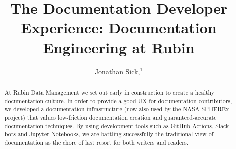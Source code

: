 \documentclass[11pt,twoside]{article}
\begin{document}
\title{The Documentation Developer Experience: Documentation Engineering at Rubin}

\author{Jonathan Sick,$^1$}





\begin{abstract}
At Rubin Data Management we set out early in construction to create a healthy documentation culture.
In order to provide a good UX for documentation contributors, we developed a documentation infrastructure (now also used by the NASA SPHEREx project) that values low-friction documentation creation and guaranteed-accurate documentation techniques.
By using development tools such as GitHub Actions, Slack bots and Jupyter Notebooks, we are battling successfully the traditional view of documentation as the chore of last resort for both writers and readers.
\end{abstract}

\end{document}
